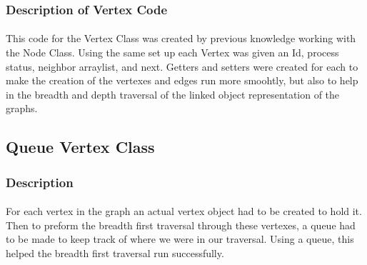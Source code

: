 \documentclass[letterpaper, 10pt,DIV=13]{scrartcl}
\numberwithin{equation}{section} %
\numberwithin{figure}{section} %
\numberwithin{table}{section} %
\begin{document}
\subsubsection{Description of Vertex Code}
\paragraph{} This code for the Vertex Class was created by previous knowledge working with the Node Class. Using the same set up each Vertex was given an Id, process status, neighbor arraylist, and next. Getters and setters were created for each to make the creation of the vertexes and edges run more smoohtly, but also to help in the breadth and depth traversal of the linked object representation of the graphs. 

\subsection{Queue Vertex Class}

\subsubsection{Description}
\paragraph{} For each vertex in the graph an actual vertex object had to be created to hold it. Then to preform the breadth first traversal through these vertexes, a queue had to be made to keep track of where we were in our traversal. Using a queue, this helped the breadth first traversal run successfully.  
\end{document}
